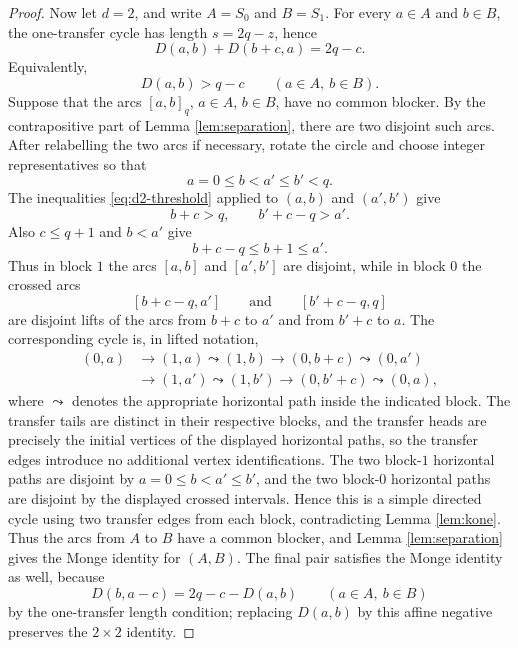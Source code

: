 \documentclass[11pt]{article}
\theoremstyle{definition}
\theoremstyle{remark}
\begin{document}
\begin{proof}
Now let $d=2$, and write $A=S_0$ and $B=S_1$.  For every $a\in A$ and $b\in B$, the one-transfer cycle has length $s=2q-z$, hence
\[
        D(a,b)+D(b+c,a)=2q-c .
\]
Equivalently,
\begin{equation}
        D(a,b)>q-c
        \qquad(a\in A,\ b\in B).
        \label{eq:d2-threshold}
\end{equation}
Suppose that the arcs $[a,b]_q$, $a\in A$, $b\in B$, have no common blocker.  By the contrapositive part of Lemma \ref{lem:separation}, there are two disjoint such arcs.  After relabelling the two arcs if necessary, rotate the circle and choose integer representatives so that
\[
        a=0\le b<a'\le b'<q .
\]
The inequalities \eqref{eq:d2-threshold} applied to $(a,b)$ and $(a',b')$ give
\[
        b+c>q,
        \qquad
        b'+c-q>a' .
\]
Also $c\le q+1$ and $b<a'$ give
\[
        b+c-q\le b+1\le a' .
\]
Thus in block $1$ the arcs $[a,b]$ and $[a',b']$ are disjoint, while in block $0$ the crossed arcs
\[
        [b+c-q,a']
        \qquad\text{and}\qquad
        [b'+c-q,q]
\]
are disjoint lifts of the arcs from $b+c$ to $a'$ and from $b'+c$ to $a$.  The corresponding cycle is, in lifted notation,
\[
\begin{aligned}
        (0,a)&\to(1,a)\leadsto(1,b)\to(0,b+c)
        \leadsto(0,a')  \\
        &\to(1,a')\leadsto(1,b')\to(0,b'+c)
        \leadsto(0,a),
\end{aligned}
\]
where $\leadsto$ denotes the appropriate horizontal path inside the indicated
block.  The transfer tails are distinct in their respective blocks, and the
transfer heads are precisely the initial vertices of the displayed horizontal
paths, so the transfer edges introduce no additional vertex identifications.
The two block-$1$ horizontal paths are disjoint by $a=0\le b<a'\le b'$, and the
two block-$0$ horizontal paths are disjoint by the displayed crossed intervals.
Hence this is a simple directed cycle using two transfer edges from each block,
contradicting Lemma \ref{lem:kone}.  Thus the arcs from $A$ to $B$ have a common
blocker, and Lemma \ref{lem:separation} gives the Monge identity for $(A,B)$.
The final pair satisfies the Monge identity as well, because
\[
        D(b,a-c)=2q-c-D(a,b)
        \qquad(a\in A,\ b\in B)
\]
by the one-transfer length condition; replacing $D(a,b)$ by this affine negative preserves the $2\times2$ identity.


\end{proof}
\end{document}
